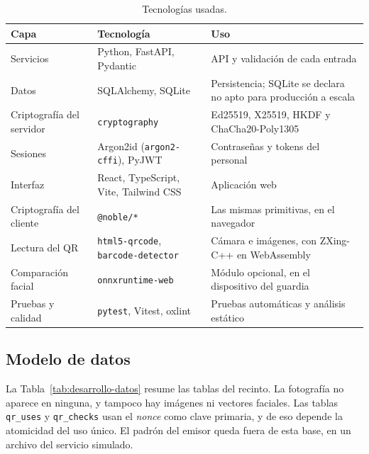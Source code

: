 \begin{table}[htbp]
  \centering
  \caption{Tecnologías usadas.}
  \label{tab:desarrollo-tecnologias}
  \small
  \begin{tabular}{p{3.0cm}p{5.0cm}p{5.4cm}}
    \toprule
    Capa & Tecnología & Uso \\
    \midrule
    Servicios & Python, FastAPI, Pydantic & API y validación de cada entrada \\
    Datos & SQLAlchemy, SQLite & Persistencia; SQLite se declara no apto para producción a escala \\
    Criptografía del servidor & \texttt{cryptography} & Ed25519, X25519, HKDF y ChaCha20-Poly1305 \\
    Sesiones & Argon2id (\texttt{argon2-cffi}), PyJWT & Contraseñas y tokens del personal \\
    Interfaz & React, TypeScript, Vite, Tailwind CSS & Aplicación web \\
    Criptografía del cliente & \texttt{@noble/*} & Las mismas primitivas, en el navegador \\
    Lectura del QR & \texttt{html5-qrcode}, \texttt{barcode-detector} & Cámara e imágenes, con ZXing-C++ en WebAssembly \\
    Comparación facial & \texttt{onnxruntime-web} & Módulo opcional, en el dispositivo del guardia \\
    Pruebas y calidad & \texttt{pytest}, Vitest, oxlint & Pruebas automáticas y análisis estático \\
    \bottomrule
  \end{tabular}
\end{table}

\subsection{Modelo de datos}
\label{subsec:desarrollo-datos}

La Tabla~\ref{tab:desarrollo-datos} resume las tablas del recinto. La fotografía no aparece en ninguna, y tampoco
hay imágenes ni vectores faciales. Las tablas \texttt{qr\_uses} y \texttt{qr\_checks} usan el \textit{nonce} como
clave primaria, y de eso depende la atomicidad del uso único.
El padrón del emisor queda fuera de esta base, en un archivo del servicio simulado.


